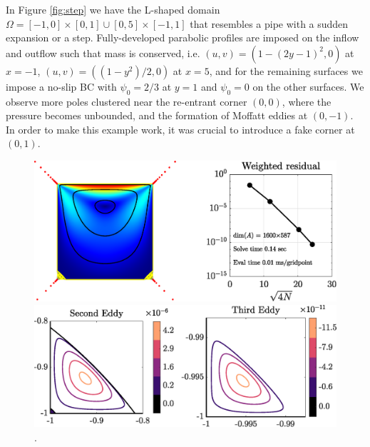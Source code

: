 In Figure \ref{fig:step} we have the L-shaped domain $\Omega = [-1,0] \times [0,1] \cup [0,5]\times[-1,1]$ that resembles a pipe with a sudden expansion or a step. Fully-developed parabolic profiles are imposed on the inflow and outflow such that mass is conserved, i.e. $(u,v)=(1-(2y-1)^2,0)$ at $x=-1$, $(u,v)=((1-y^2)/2,0)$ at $x=5$, and for the remaining surfaces we impose a no-slip BC with $\psi_0=2/3$ at $y=1$ and $\psi_0=0$ on the other surfaces. We observe more poles clustered near the re-entrant corner $(0,0)$, where the pressure becomes unbounded, and the formation of Moffatt eddies at $(0,-1)$. In order to make this example work, it was crucial to introduce a fake corner at $(0,1)$.


\begin{figure}[H]
	
	\centering
	\includegraphics[width=\linewidth]{Figures/ldc}
	
	\vspace{2em}
	\includegraphics[width=\linewidth]{Figures/ldc_eddy}
	
	\caption{.}
	\label{fig:ldc}
\end{figure} 

